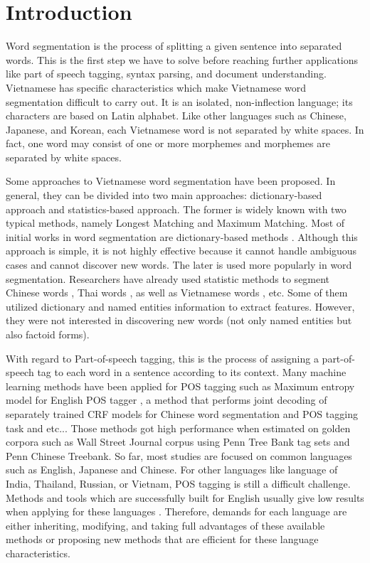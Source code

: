 \documentclass[english]{jnlp_1.4}
\begin{document}
\maketitle

\section{Introduction}
Word segmentation is the process of splitting a given sentence into separated words.
This is the first step we have to solve before reaching further applications
like part of speech tagging, syntax parsing, and document understanding.
Vietnamese has specific characteristics which make Vietnamese word
segmentation difficult to carry out. It is an isolated, non-inflection language; its characters are based on Latin
alphabet. Like other languages such as Chinese, Japanese, and Korean,
each Vietnamese word is not separated by white spaces. In fact,
one word may consist of one or more morphemes and morphemes are
separated by white spaces.

Some approaches to Vietnamese word segmentation have been proposed.
In general, they can be divided into two main approaches:
dictionary-based approach and statistics-based approach. The former
is widely known with two typical methods, namely Longest Matching
and Maximum Matching. Most of initial works in word segmentation are
dictionary-based methods \cite{Poowarawan86} \cite{Wong96}. Although this approach is simple, it is
not highly effective because it cannot handle
ambiguous cases and cannot discover new words. The later is
used more popularly in word segmentation. Researchers have already
used statistic methods to segment Chinese words \cite{Gao05} \cite{Mao98},
Thai words \cite{Mekanavin97}, as well as Vietnamese words  \cite{CamTu07} \cite{Dien06} \cite{Ha03}, etc.
Some of them utilized dictionary and named entities information to extract features.
However, they were not interested in discovering new words (not only named entities but also factoid forms).

With regard to Part-of-speech tagging, this is the process of assigning a part-of-speech tag to each word in a sentence according to its context.
 Many machine learning methods have been applied for POS tagging such as
 Maximum entropy model for English POS tagger \cite{Ratnaparkhi97}, a method that performs joint decoding of separately trained CRF models for Chinese word segmentation and POS tagging task \cite{ShiandWang07} and etc... Those methods got high performance when estimated on golden corpora such as Wall Street Journal corpus using Penn Tree Bank tag sets and Penn Chinese Treebank. So far, most studies are focused on common languages such as English, Japanese and Chinese. For other languages like language of India, Thailand, Russian, or Vietnam, POS tagging is still a difficult challenge. Methods and tools which are successfully built for English usually give low results when applying for these languages \cite{Hasan07}. Therefore, demands for each language are either inheriting, modifying, and taking full advantages of these available methods or proposing new methods that are efficient for these language
 characteristics.
\end{document}
